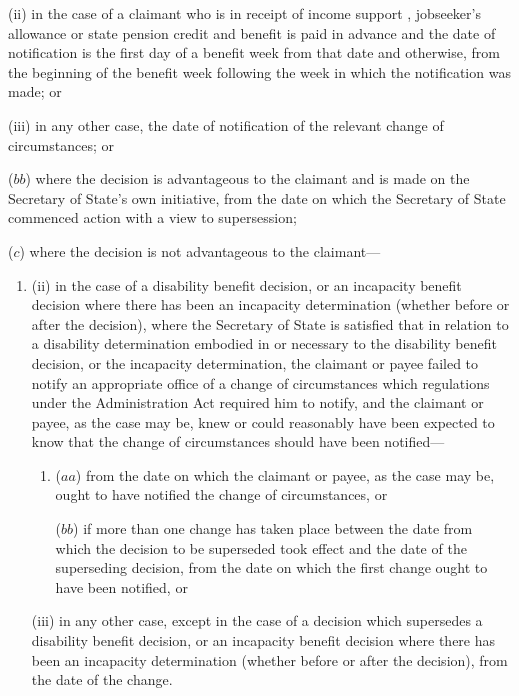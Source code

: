 \documentclass[12pt,a4paper]{article}
\begin{document}
\begin{enumerate}
\begin{enumerate}
(ii) in the case of a claimant who is in receipt of income support%
, jobseeker's allowance or state pension credit  %
and benefit is paid in advance and the date of notification is the first day of a benefit week from that date and otherwise, from the beginning of the benefit week following the week in which the notification was made; or

(iii) in any other case, the date of notification of the relevant change of circumstances; or
\end{enumerate}

($bb$) where the decision is advantageous to the claimant and is made on the Secretary of State’s own initiative, from the date on which the Secretary of State commenced action with a view to supersession;

($c$) where the decision is not advantageous to the claimant—
\begin{enumerate}\item[]


(ii) in the case of a disability benefit decision, or an incapacity benefit decision where there has been an incapacity determination (whether before or after the decision), where the Secretary of State is satisfied that in relation to a disability determination embodied in or necessary to the disability benefit decision, or the incapacity determination, the claimant or payee failed to notify an appropriate office of a change of circumstances which regulations under the Administration Act required him to notify, and the claimant or payee, as the case may be, knew or could reasonably have been expected to know that the change of circumstances should have been notified---
\begin{enumerate}\item[]
($aa$) from the date on which the claimant or payee, as the case may be, ought to have notified the change of circumstances, or

($bb$) if more than one change has taken place between the date from which the decision to be superseded took effect and the date of the superseding decision, from the date on which the first change ought to have been notified, or
\end{enumerate}

(iii) in any other case, except in the case of a decision which supersedes a disability benefit decision, or an incapacity benefit decision where there has been an incapacity determination (whether before or after the decision), from the date of the change.
\end{enumerate}
\end{enumerate}
\end{document}
